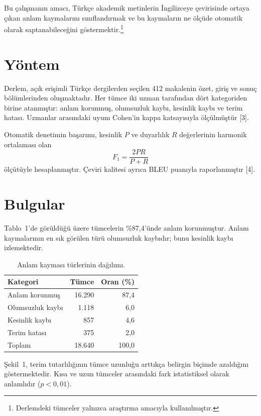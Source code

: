 \documentclass[10pt,a4paper,twocolumn]{article}
\begin{document}
Bu çalışmanın amacı, Türkçe akademik metinlerin İngilizceye çevirisinde ortaya çıkan anlam
kaymalarını sınıflandırmak ve bu kaymaların ne ölçüde otomatik olarak saptanabileceğini
göstermektir.\footnote{Derlemdeki tümceler yalnızca araştırma amacıyla kullanılmıştır.}

\section{Yöntem}
Derlem, açık erişimli Türkçe dergilerden seçilen 412 makalenin özet, giriş ve sonuç
bölümlerinden oluşmaktadır. Her tümce iki uzman tarafından dört kategoriden birine atanmıştır:
anlam korunmuş, olumsuzluk kaybı, kesinlik kaybı ve terim hatası. Uzmanlar arasındaki uyum
Cohen'in kappa katsayısıyla ölçülmüştür [3].

Otomatik denetimin başarımı, kesinlik $P$ ve duyarlılık $R$ değerlerinin harmonik ortalaması olan
\begin{equation}
F_1 = \frac{2PR}{P+R}
\end{equation}
ölçütüyle hesaplanmıştır. Çeviri kalitesi ayrıca BLEU puanıyla raporlanmıştır [4].

\section{Bulgular}
Tablo~1'de görüldüğü üzere tümcelerin \%87,4'ünde anlam korunmuştur. Anlam kaymalarının en sık
görülen türü olumsuzluk kaybıdır; bunu kesinlik kaybı izlemektedir.

\begin{table}[h]
\centering
\caption{Anlam kayması türlerinin dağılımı.}
\begin{tabular}{lrr}
\toprule
Kategori & Tümce & Oran (\%) \\
\midrule
Anlam korunmuş & 16.290 & 87,4 \\
Olumsuzluk kaybı & 1.118 & 6,0 \\
Kesinlik kaybı & 857 & 4,6 \\
Terim hatası & 375 & 2,0 \\
\midrule
Toplam & 18.640 & 100,0 \\
\bottomrule
\end{tabular}
\end{table}

Şekil~1, terim tutarlılığının tümce uzunluğu arttıkça belirgin biçimde azaldığını
göstermektedir. Kısa ve uzun tümceler arasındaki fark istatistiksel olarak anlamlıdır
($p < 0{,}01$).
\end{document}
